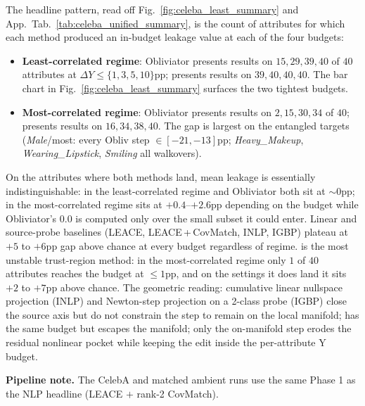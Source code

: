 The headline pattern, read off Fig.~\ref{fig:celeba_least_summary} and App.~Tab.~\ref{tab:celeba_unified_summary}, is the count of attributes for which each method produced an in-budget leakage value at each of the four budgets:
\begin{itemize}
    \item \textbf{Least-correlated regime}: Obliviator presents results on $15, 29, 39, 40$ of $40$ attributes at $\Delta Y \le \{1, 3, 5, 10\}$pp; \TanGCEpp{} presents results on $39, 40, 40, 40$. The bar chart in Fig.~\ref{fig:celeba_least_summary} surfaces the two tightest budgets.
    \item \textbf{Most-correlated regime}: Obliviator presents results on $2, 15, 30, 34$ of $40$; \TanGCEpp{} presents results on $16, 34, 38, 40$. The gap is largest on the entangled targets (\emph{Male}/most: every Obliv step $\in[-21, -13]$pp; \emph{Heavy\_Makeup}, \emph{Wearing\_Lipstick}, \emph{Smiling} all walkovers).
\end{itemize}
On the attributes where both methods land, mean leakage is essentially indistinguishable: in the least-correlated regime \TanGCEpp{} and Obliviator both sit at $\sim 0$pp; in the most-correlated regime \TanGCEpp{} sits at $+0.4$--$+2.6$pp depending on the budget while Obliviator's $0.0$ is computed only over the small subset it could enter. Linear and source-probe baselines (LEACE, LEACE\,+\,CovMatch, INLP, IGBP) plateau at $+5$ to $+6$pp gap above chance at every budget regardless of regime. \AmbGCEpp{} is the most unstable trust-region method: in the most-correlated regime only $1$ of $40$ attributes reaches the budget at $\le 1$pp, and on the settings it does land it sits $+2$ to $+7$pp above chance. The geometric reading: cumulative linear nullspace projection (INLP) and Newton-step projection on a 2-class probe (IGBP) close the source axis but do not constrain the step to remain on the local manifold; \AmbGCEpp{} has the same budget but escapes the manifold; only the on-manifold step erodes the residual nonlinear pocket while keeping the edit inside the per-attribute Y budget.

\textbf{Pipeline note.} The CelebA \TanGCEpp{} and matched ambient \AmbGCEpp{} runs use the same Phase 1 as the NLP headline (LEACE $+$ rank-2 CovMatch).
